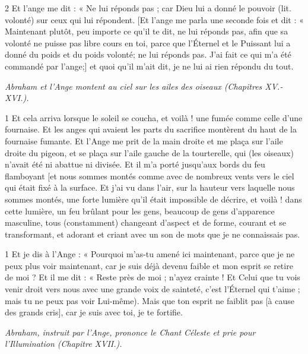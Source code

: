 \par 2 Et l'ange me dit : « Ne lui réponds pas ; car Dieu lui a donné le pouvoir (lit. volonté) sur ceux qui lui répondent. [Et l'ange me parla une seconde fois et dit : « Maintenant plutôt, peu importe ce qu'il te dit, ne lui réponds pas, afin que sa volonté ne puisse pas libre cours en toi, parce que l'Éternel et le Puissant lui a donné du poids et du poids volonté; ne lui réponds pas. J'ai fait ce qui m'a été commandé par l'ange;] et quoi qu'il m'ait dit, je ne lui ai rien répondu du tout.


\par \textit{Abraham et l'Ange montent au ciel sur les ailes des oiseaux (Chapitres XV.-XVI.).}

\par 1 Et cela arriva lorsque le soleil se coucha, et voilà ! une fumée comme celle d'une fournaise. Et les anges qui avaient les parts du sacrifice montèrent du haut de la fournaise fumante. Et l'Ange me prit de la main droite et me plaça sur l'aile droite du pigeon, et se plaça sur l'aile gauche de la tourterelle, qui (les oiseaux) n'avait été ni abattue ni divisée. Et il m'a porté jusqu'aux bords du feu flamboyant [et nous sommes montés comme avec de nombreux vents vers le ciel qui était fixé à la surface. Et j'ai vu dans l'air, sur la hauteur vers laquelle nous sommes montés, une forte lumière qu'il était impossible de décrire, et voilà ! dans cette lumière, un feu brûlant pour les gens, beaucoup de gens d'apparence masculine, tous (constamment) changeant d'aspect et de forme, courant et se transformant, et adorant et criant avec un son de mots que je ne connaissais pas.


\par 1 Et je dis à l'Ange : « Pourquoi m'as-tu amené ici maintenant, parce que je ne peux plus voir maintenant, car je suis déjà devenu faible et mon esprit se retire de moi ? Et il me dit : « Reste près de moi ; n'ayez crainte ! Et Celui que tu vois venir droit vers nous avec une grande voix de sainteté, c'est l'Éternel qui t'aime ; mais tu ne peux pas voir Lui-même). Mais que ton esprit ne faiblit pas [à cause des grands cris], car je suis avec toi, je te fortifie.


\par \textit{Abraham, instruit par l'Ange, prononce le Chant Céleste et prie pour l'Illumination (Chapitre XVII.).}


